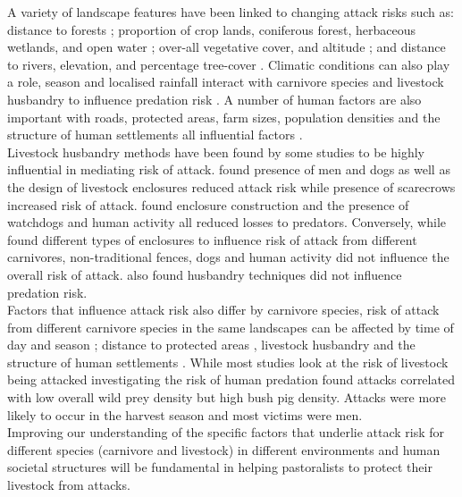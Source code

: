 A variety of landscape features have been linked to changing attack risks such as: distance to forests \cite{DeAzevedo2007}; proportion of crop lands, coniferous forest, herbaceous wetlands, and open water \cite{Treves2015}; over-all vegetative cover, and altitude \cite{Zarco-Gonzalez2013}; and distance to rivers, elevation, and percentage tree-cover \cite{Abade2014h}. Climatic conditions can also play a role, season and localised rainfall interact with carnivore species and livestock husbandry to influence predation risk \cite{Kissui2008,Abade2014h}. A number of human factors are also important with roads, protected areas, farm sizes, population densities and the structure of human settlements all influential factors \cite{Treves2015,Zarco-Gonzalez2012,Holmern2007a}.\\

Livestock husbandry methods have been found by some studies to be highly influential in mediating risk of attack. \citet{Woodroffe2007} found presence of men and dogs as well as the design of livestock enclosures reduced attack risk while presence of scarecrows increased risk of attack. \citet{Ogada2003} found enclosure construction and the presence of watchdogs and human activity all reduced losses to predators. Conversely, while \citet{Kolowski2006} found different types of enclosures to influence risk of attack from different carnivores, non-traditional fences, dogs and human activity did not influence the overall risk of attack. \citet{Abade2014h} also found husbandry techniques did not influence predation risk.\\

Factors that influence attack risk also differ by carnivore species, risk of attack from different carnivore species in the same landscapes can be affected by time of day and season \cite{Kissui2008,}; distance to protected areas \cite{Holmern2007a}, livestock husbandry \cite{Woodroffe2007,Kolowski2006} and the structure of human settlements \cite{Kolowski2006}. While most studies look at the risk of livestock being attacked \citet{Packer2005} investigating the risk of human predation found attacks correlated with low overall wild prey density but high bush pig density. Attacks were more likely to occur in the harvest season and most victims were men.\\

Improving our understanding of the specific factors that underlie attack risk for different species (carnivore and livestock) in different environments and human societal structures will be fundamental in helping pastoralists to protect their livestock from attacks.\\

